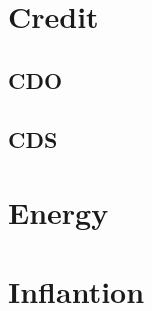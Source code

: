 \documentclass{book}
\begin{document}
\chapter{Credit}
\label{cha:credit}

\section{CDO}
\label{sec:cdo}

\section{CDS}
\label{sec:cds}


\chapter{Energy}
\label{cha:energy}

\chapter{Inflantion}
\label{cha:inflantion}
\end{document}
